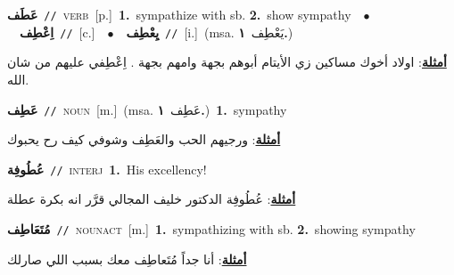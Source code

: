 \documentclass[10pt,a4paper,twoside]{article} %
\begin{document}
\begin{multicols}{2}
{\setlength\topsep{0pt}\textbf{\foreignlanguage{arabic}{عَطَف}}\ {\color{gray}\texttt{//}\color{black}}\ \textsc{verb}\ [p.]\ \textbf{1.}~sympathize with sb.  \textbf{2.}~show sympathy\ \ $\bullet$\ \ \setlength\topsep{0pt}\textbf{\foreignlanguage{arabic}{اِعْطِف}}\ {\color{gray}\texttt{//}\color{black}}\ [c.]\ \ $\bullet$\ \ \setlength\topsep{0pt}\textbf{\foreignlanguage{arabic}{يِعْطِف}}\ {\color{gray}\texttt{//}\color{black}}\ [i.]\ \color{gray}(msa. \foreignlanguage{arabic}{يَعْطِف}~\foreignlanguage{arabic}{\textbf{١.}})\color{black}\  \begin{flushright}\color{gray}\foreignlanguage{arabic}{\textbf{\underline{\foreignlanguage{arabic}{أمثلة}}}: اولاد أخوك مساكين زي الأيتام أبوهم بجهة وامهم بجهة . اِعْطِفي عليهم من شان الله.}\end{flushright}\color{black}} \vspace{2mm}

{\setlength\topsep{0pt}\textbf{\foreignlanguage{arabic}{عَطِف}}\ {\color{gray}\texttt{//}\color{black}}\ \textsc{noun}\ [m.]\ \color{gray}(msa. \foreignlanguage{arabic}{عَطِف}~\foreignlanguage{arabic}{\textbf{١.}})\color{black}\ \textbf{1.}~sympathy\  \begin{flushright}\color{gray}\foreignlanguage{arabic}{\textbf{\underline{\foreignlanguage{arabic}{أمثلة}}}: ورجيهم الحب والعَطِف وشوفي كيف رح يحبوك}\end{flushright}\color{black}} \vspace{2mm}

{\setlength\topsep{0pt}\textbf{\foreignlanguage{arabic}{عُطُوفِة}}\ {\color{gray}\texttt{//}\color{black}}\ \textsc{interj}\ \textbf{1.}~His excellency!\  \begin{flushright}\color{gray}\foreignlanguage{arabic}{\textbf{\underline{\foreignlanguage{arabic}{أمثلة}}}: عُطُوفِة الدكتور خليف المجالي قرَّر انه بكرة عطلة}\end{flushright}\color{black}} \vspace{2mm}

{\setlength\topsep{0pt}\textbf{\foreignlanguage{arabic}{مُتَعَاطِف}}\ {\color{gray}\texttt{//}\color{black}}\ \textsc{noun\textunderscore act}\ [m.]\ \textbf{1.}~sympathizing with sb.  \textbf{2.}~showing sympathy\  \begin{flushright}\color{gray}\foreignlanguage{arabic}{\textbf{\underline{\foreignlanguage{arabic}{أمثلة}}}: أنا جداً مُتَعاطِف معك بسبب اللي صارلك}\end{flushright}\color{black}} \vspace{2mm}


\end{multicols}
\end{document}
